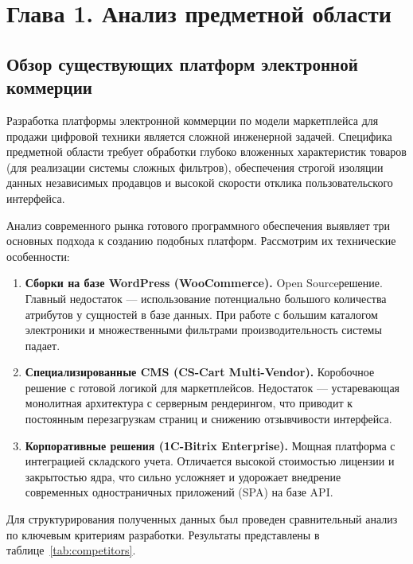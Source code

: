 \section*{Глава 1. Анализ предметной области}

\subsection{Обзор существующих платформ электронной коммерции}

Разработка платформы электронной коммерции по модели маркетплейса для продажи цифровой техники является сложной инженерной задачей. Специфика 
предметной области требует обработки глубоко вложенных характеристик товаров (для реализации системы сложных фильтров), обеспечения 
строгой изоляции данных независимых продавцов и высокой скорости отклика пользовательского интерфейса.

Анализ современного рынка готового программного обеспечения выявляет три основных подхода к созданию подобных платформ. Рассмотрим 
их технические особенности:

\begin{enumerate}
    \item \textbf{Сборки на базе WordPress (WooCommerce).} Open Source\footnotemark решение. Главный недостаток — использование 
	потенциально большого количества атрибутов у сущностей в базе данных. При работе с большим каталогом электроники и множественными 
	фильтрами производительность системы падает.
    
    \item \textbf{Специализированные CMS (CS-Cart Multi-Vendor).} Коробочное решение с готовой логикой для маркетплейсов. Недостаток — устаревающая 
	монолитная архитектура с серверным рендерингом, что приводит к постоянным перезагрузкам страниц и снижению отзывчивости интерфейса.
    
    \item \textbf{Корпоративные решения (1C-Bitrix Enterprise).} Мощная платформа с интеграцией складского учета. Отличается высокой стоимостью 
	лицензии и закрытостью ядра, что сильно усложняет и удорожает внедрение современных одностраничных приложений (SPA) на базе API.
\end{enumerate}


Для структурирования полученных данных был проведен сравнительный анализ по ключевым критериям разработки. Результаты представлены 
в таблице~\ref{tab:competitors}.

